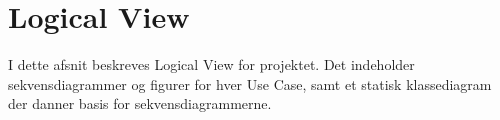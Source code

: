 \documentclass[Main]{subfiles}
\begin{document}
\section{Logical View}
I dette afsnit beskreves Logical View for projektet.
Det indeholder sekvensdiagrammer og figurer for hver Use Case, samt et statisk klassediagram der danner basis for sekvensdiagrammerne.




\newpage

\end{document}
